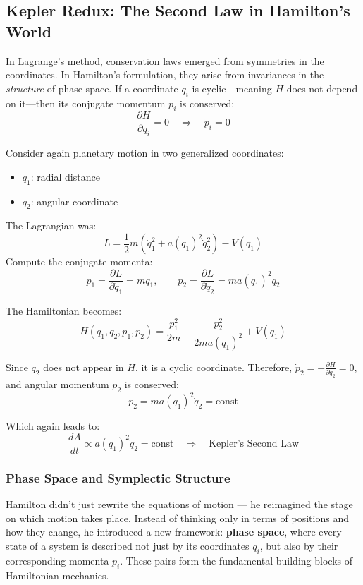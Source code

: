       
    
  

\subsection{Kepler Redux: The Second Law in Hamilton’s World}

In Lagrange’s method, conservation laws emerged from symmetries in the coordinates. In Hamilton’s formulation, they arise from invariances in the \emph{structure} of phase space. If a coordinate \( q_i \) is cyclic—meaning \( H \) does not depend on it—then its conjugate momentum \( p_i \) is conserved:
\[
\frac{\partial H}{\partial q_i} = 0 \quad \Rightarrow \quad \dot{p}_i = 0
\]

Consider again planetary motion in two generalized coordinates:
\begin{itemize}
  \item \( q_1 \): radial distance
  \item \( q_2 \): angular coordinate
\end{itemize}

The Lagrangian was:
\[
L = \frac{1}{2} m \left( \dot{q}_1^2 + a(q_1)^2 \dot{q}_2^2 \right) - V(q_1)
\]
Compute the conjugate momenta:
\[
p_1 = \frac{\partial L}{\partial \dot{q}_1} = m \dot{q}_1, \qquad
p_2 = \frac{\partial L}{\partial \dot{q}_2} = m a(q_1)^2 \dot{q}_2
\]

The Hamiltonian becomes:
\[
H(q_1, q_2, p_1, p_2) = \frac{p_1^2}{2m} + \frac{p_2^2}{2m a(q_1)^2} + V(q_1)
\]

Since \( q_2 \) does not appear in \( H \), it is a cyclic coordinate. Therefore, \( \dot{p}_2 = -\frac{\partial H}{\partial q_2} = 0 \), and angular momentum \( p_2 \) is conserved:
\[
p_2 = m a(q_1)^2 \dot{q}_2 = \text{const}
\]

Which again leads to:
\[
\frac{dA}{dt} \propto a(q_1)^2 \dot{q}_2 = \text{const}
\quad \Rightarrow \quad \text{Kepler’s Second Law}
\]

\subsubsection{Phase Space and Symplectic Structure}

Hamilton didn’t just rewrite the equations of motion — he reimagined the stage on which motion takes place. Instead of thinking only in terms of positions and how they change, he introduced a new framework: \textbf{phase space}, where every state of a system is described not just by its coordinates \( q_i \), but also by their corresponding momenta \( p_i \). These pairs form the fundamental building blocks of Hamiltonian mechanics.

